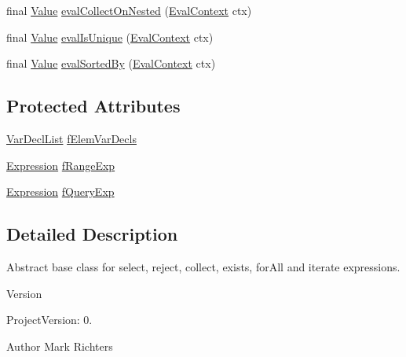 \begin{DoxyCompactItemize}
\item 
final \hyperlink{classorg_1_1tzi_1_1use_1_1uml_1_1ocl_1_1value_1_1_value}{Value} \hyperlink{classorg_1_1tzi_1_1use_1_1uml_1_1ocl_1_1expr_1_1_exp_query_aaf818c5e06fce51ea853f63134ef40c4}{eval\-Collect\-On\-Nested} (\hyperlink{classorg_1_1tzi_1_1use_1_1uml_1_1ocl_1_1expr_1_1_eval_context}{Eval\-Context} ctx)
\item 
final \hyperlink{classorg_1_1tzi_1_1use_1_1uml_1_1ocl_1_1value_1_1_value}{Value} \hyperlink{classorg_1_1tzi_1_1use_1_1uml_1_1ocl_1_1expr_1_1_exp_query_a233064c7a9ea82602f08536d56eb71ca}{eval\-Is\-Unique} (\hyperlink{classorg_1_1tzi_1_1use_1_1uml_1_1ocl_1_1expr_1_1_eval_context}{Eval\-Context} ctx)
\item 
final \hyperlink{classorg_1_1tzi_1_1use_1_1uml_1_1ocl_1_1value_1_1_value}{Value} \hyperlink{classorg_1_1tzi_1_1use_1_1uml_1_1ocl_1_1expr_1_1_exp_query_a38f40159ca8fb3500e77a84e869e35c8}{eval\-Sorted\-By} (\hyperlink{classorg_1_1tzi_1_1use_1_1uml_1_1ocl_1_1expr_1_1_eval_context}{Eval\-Context} ctx)
\end{DoxyCompactItemize}
\subsection*{Protected Attributes}
\begin{DoxyCompactItemize}
\item 
\hyperlink{classorg_1_1tzi_1_1use_1_1uml_1_1ocl_1_1expr_1_1_var_decl_list}{Var\-Decl\-List} \hyperlink{classorg_1_1tzi_1_1use_1_1uml_1_1ocl_1_1expr_1_1_exp_query_a7e40f4075438ec4592d115c2fe34eb73}{f\-Elem\-Var\-Decls}
\item 
\hyperlink{classorg_1_1tzi_1_1use_1_1uml_1_1ocl_1_1expr_1_1_expression}{Expression} \hyperlink{classorg_1_1tzi_1_1use_1_1uml_1_1ocl_1_1expr_1_1_exp_query_a2444567d3e10350a6c4936e1685b20fb}{f\-Range\-Exp}
\item 
\hyperlink{classorg_1_1tzi_1_1use_1_1uml_1_1ocl_1_1expr_1_1_expression}{Expression} \hyperlink{classorg_1_1tzi_1_1use_1_1uml_1_1ocl_1_1expr_1_1_exp_query_ac5a43d4322a25df31d0094249a498b4f}{f\-Query\-Exp}
\end{DoxyCompactItemize}


\subsection{Detailed Description}
Abstract base class for select, reject, collect, exists, for\-All and iterate expressions.

\begin{DoxyVersion}{Version}

\end{DoxyVersion}
\begin{DoxyParagraph}{Project\-Version\-:}
0. 
\end{DoxyParagraph}
\begin{DoxyAuthor}{Author}
Mark Richters 
\end{DoxyAuthor}


